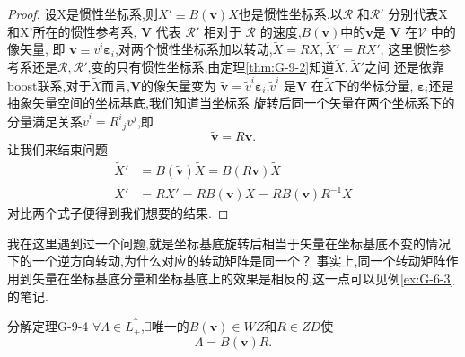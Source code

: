 \documentclass[../main.tex]{subfiles}
\begin{document}
\begin{proof}
	设X是惯性坐标系,则$X' \equiv B(\bm{v})X$也是惯性坐标系.以$\mathscr{R}$ 和$\mathscr{R}'$ 分别代表X和X'所在的惯性参考系,
	$\bm{V}$ 代表 $\mathscr{R}'$ 相对于 $\mathscr{R}$ 的速度,$B(\bm{v})$中的$\bm{v}$是 $\bm{V}$ 在$\mathscr{V}$ 中的像矢量,
	即 $ \bm{v} \equiv v^i \bm{\varepsilon}_i$,对两个惯性坐标系加以转动,$\tilde{X} = RX , \tilde{X}' = RX'$,
	这里惯性参考系还是$\mathscr{R},\mathscr{R}'$,变的只有惯性坐标系,由定理\ref{thm:G-9-2}知道$\tilde{X},\tilde{X}'$之间
	还是依靠boost联系,对于$\tilde{X}$而言,$\bm{V}$的像矢量变为 $\tilde{\bm{v}} = \tilde{v}^i \bm{\varepsilon}_i$,$\tilde{v}^i$
	是$\bm{V}$ 在$\tilde{X}$下的坐标分量, $\bm{\varepsilon}_i$还是抽象矢量空间的坐标基底,我们知道当坐标系
	旋转后同一个矢量在两个坐标系下的分量满足关系$\tilde{v}^i = R^i{}_jv^j$,即 \[
		\tilde{\bm{v}} = R\bm{v}
		.\]
	让我们来结束问题
	\begin{align*}
		\tilde{X}' & = B(\tilde{\bm{v}})\tilde{X} = B(R\bm{v})\tilde{X} \\
		\tilde{X}' & = R X' = RB(\bm{v})X = RB(\bm{v})R^{-1}\tilde{X}
	\end{align*}
	对比两个式子便得到我们想要的结果.
\end{proof}
\begin{note}
	我在这里遇到过一个问题,就是坐标基底旋转后相当于矢量在坐标基底不变的情况下的一个逆方向转动,为什么对应的转动矩阵是同一个？
	事实上,同一个转动矩阵作用到矢量在坐标基底分量和坐标基底上的效果是相反的,这一点可以见例\ref{ex:G-6-3}的笔记.
\end{note}
\begin{theorem}{分解定理}{G-9-4}
	$\forall\Lambda \in L^\uparrow_+$,$\exists $唯一的$B(\bm{v})\in WZ$和$R \in  ZD$使\[
		\Lambda = B(\bm{v})R
		.\]
\end{theorem}
\end{document}
